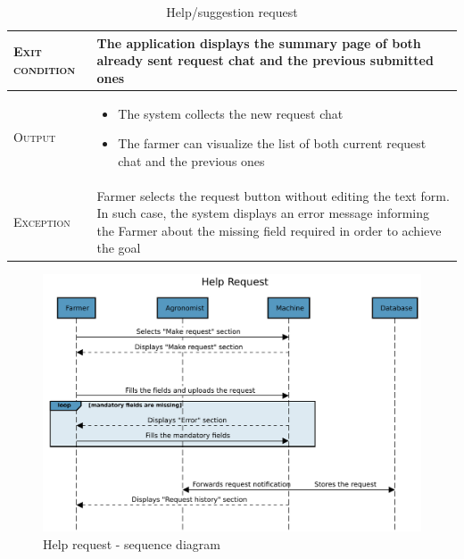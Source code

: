 \begin{table}[H]
\begin{tabular}{|l|p{}|}
        \hline %
        \textsc{Exit condition}    &  The application displays the summary page of both already sent request chat and the previous submitted ones\\
    	\hline %
    	\textsc{Output}             &  \begin{itemize}
    	    \item The system collects the new request chat
    	    \item The farmer can visualize the list of both current request chat and the previous ones
    	\end{itemize}\\
    	\hline %
    	\textsc{Exception}         &  Farmer selects the request button without editing the text form. In such case, the system displays an error message informing the Farmer about the missing field required in order to achieve the goal\\
    	\hline %
        
    \end{tabular}
    \caption{\label{tab:Help_request_submission}Help/suggestion request}

\end{table}

\begin{figure}[H]
	\centering
    \includegraphics[page=1, width=\textwidth]{Images/SeqDiag/help_request_seq_diag.pdf}
	\caption{\label{fig:help_request_seq_diag}Help request - sequence diagram}
\end{figure}


